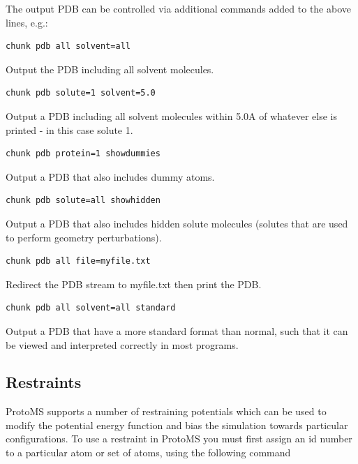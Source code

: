 \documentclass[letterpaper,10pt,english]{sphinxmanual}
\begin{document}
The output PDB can be controlled via additional commands added to the above lines, e.g.:

\begin{Verbatim}[commandchars=\\\{\}]
chunk pdb all solvent=all
\end{Verbatim}

Output the PDB including all solvent molecules.

\begin{Verbatim}[commandchars=\\\{\}]
chunk pdb solute=1 solvent=5.0
\end{Verbatim}

Output a PDB including all solvent molecules within 5.0A of whatever else is printed - in this case solute 1.

\begin{Verbatim}[commandchars=\\\{\}]
chunk pdb protein=1 showdummies
\end{Verbatim}

Output a PDB that also includes dummy atoms.

\begin{Verbatim}[commandchars=\\\{\}]
chunk pdb solute=all showhidden
\end{Verbatim}

Output a PDB that also includes hidden solute molecules (solutes that are used to perform geometry perturbations).

\begin{Verbatim}[commandchars=\\\{\}]
chunk pdb all file=myfile.txt
\end{Verbatim}

Redirect the PDB stream to myfile.txt then print the PDB.

\begin{Verbatim}[commandchars=\\\{\}]
chunk pdb all solvent=all standard
\end{Verbatim}

Output a PDB that have a more standard format than normal, such that it can be viewed and interpreted correctly in most programs.


\subsection{Restraints}
\label{protoms:index-66}\label{protoms:restraints}
ProtoMS supports a number of restraining potentials which can be used to modify the potential energy function and bias the simulation towards particular configurations. To use a restraint in ProtoMS you must first assign an id number to a particular atom or set of atoms, using the following command
\end{document}
